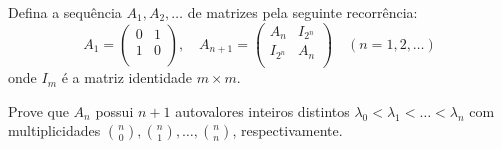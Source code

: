 Defina a sequência \(A_1,A_2,\ldots\) de matrizes pela seguinte recorrência: 
\[
A_1 = \begin{pmatrix} 0 & 1 \\ 1 & 0 \\ \end{pmatrix}, \quad A_{n+1} = \begin{pmatrix} A_n & I_{2^n} \\ I_{2^n} & A_n \\ \end{pmatrix} \quad (n=1,2,\ldots)
\]
onde \(I_m\) é a matriz identidade \(m\times m\).

Prove que \(A_n\) possui \(n+1\) autovalores inteiros distintos \(\lambda_0< \lambda_1<\ldots <\lambda_n\) com multiplicidades \(\binom{n}{0},\binom{n}{1},\ldots,\binom{n}{n}\), respectivamente.
